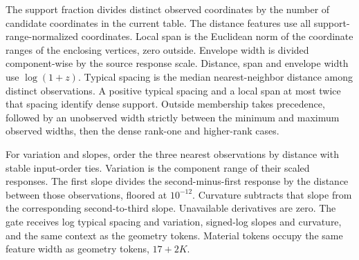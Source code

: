 The support fraction divides distinct observed coordinates by the number of candidate coordinates in the current table. The distance features use all support-range-normalized coordinates. Local span is the Euclidean norm of the coordinate ranges of the enclosing vertices, zero outside. Envelope width is divided component-wise by the source response scale. Distance, span and envelope width use $\log(1+z)$. Typical spacing is the median nearest-neighbor distance among distinct observations. A positive typical spacing and a local span at most twice that spacing identify dense support. Outside membership takes precedence, followed by an unobserved width strictly between the minimum and maximum observed widths, then the dense rank-one and higher-rank cases.

For variation and slopes, order the three nearest observations by distance with stable input-order ties. Variation is the component range of their scaled responses. The first slope divides the second-minus-first response by the distance between those observations, floored at $10^{-12}$. Curvature subtracts that slope from the corresponding second-to-third slope. Unavailable derivatives are zero. The gate receives log typical spacing and variation, signed-log slopes and curvature, and the same context as the geometry tokens. Material tokens occupy the same feature width as geometry tokens, $17+2K$.
